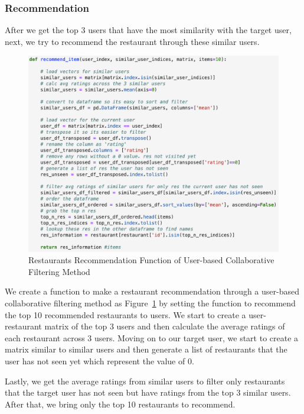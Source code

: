 \documentclass[12pt,oneside,openright,a4paper]{cpe-english-project}
\begin{document}
\subsubsection{Recommendation}

After we get the top 3 users that have the most similarity with the target user, next, we try to recommend the restaurant through these similar users.

\begin{figure}[H]\centering
\includegraphics[width=350pt]{./images/4RestaurantsRecommendationFunctionofUserbasedCollaborativeFilteringMethod.png}
\caption{Restaurants Recommendation Function of User-based Collaborative Filtering Method}\label{fig:4RestaurantsRecommendationFunctionofUserbasedCollaborativeFilteringMethod}
\end{figure}\vspace{-24pt}

We create a function to make a restaurant recommendation through a user-based collaborative filtering method as Figure~\ref{fig:4RestaurantsRecommendationFunctionofUserbasedCollaborativeFilteringMethod} by setting the function to recommend the top 10 recommended restaurants to users. We start to create a user-restaurant matrix of the top 3 users and then calculate the average ratings of each restaurant across 3 users. Moving on to our target user, we start to create a matrix similar to similar users and then generate a list of restaurants that the user has not seen yet which represent the value of 0.

Lastly, we get the average ratings from similar users to filter only restaurants that the target user has not seen but have ratings from the top 3 similar users. After that, we bring only the top 10 restaurants to recommend.
\end{document}
